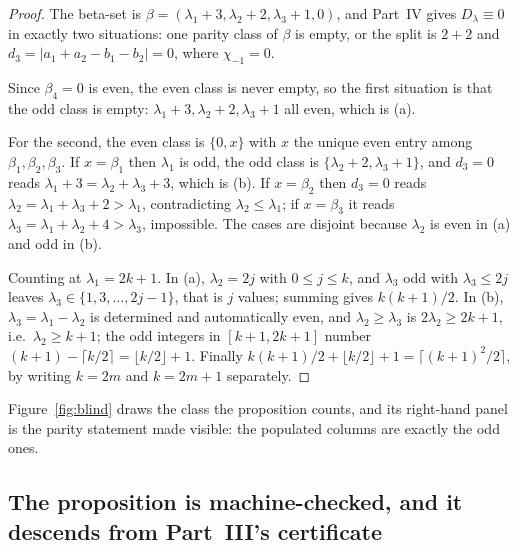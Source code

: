 \documentclass[11pt,a4paper]{article}
\begin{document}
\begin{proof}
The beta-set is $\beta=(\lambda_1+3,\lambda_2+2,\lambda_3+1,0)$, and Part~IV gives $D_\lambda\equiv0$
in exactly two situations: one parity class of $\beta$ is empty, or the split is $2+2$ and
$d_3=|a_1+a_2-b_1-b_2|=0$, where $\chi_{-1}=0$.

Since $\beta_4=0$ is even, the even class is never empty, so the first situation is that the odd
class is empty: $\lambda_1+3,\lambda_2+2,\lambda_3+1$ all even, which is (a).

For the second, the even class is $\{0,x\}$ with $x$ the unique even entry among
$\beta_1,\beta_2,\beta_3$. If $x=\beta_1$ then $\lambda_1$ is odd, the odd class is
$\{\lambda_2+2,\lambda_3+1\}$, and $d_3=0$ reads $\lambda_1+3=\lambda_2+\lambda_3+3$, which is (b).
If $x=\beta_2$ then $d_3=0$ reads $\lambda_2=\lambda_1+\lambda_3+2>\lambda_1$, contradicting
$\lambda_2\le\lambda_1$; if $x=\beta_3$ it reads $\lambda_3=\lambda_1+\lambda_2+4>\lambda_3$,
impossible. The cases are disjoint because $\lambda_2$ is even in (a) and odd in (b).

Counting at $\lambda_1=2k+1$. In (a), $\lambda_2=2j$ with $0\le j\le k$, and $\lambda_3$ odd with
$\lambda_3\le 2j$ leaves $\lambda_3\in\{1,3,\dots,2j-1\}$, that is $j$ values; summing gives
$k(k+1)/2$. In (b), $\lambda_3=\lambda_1-\lambda_2$ is determined and automatically even, and
$\lambda_2\ge\lambda_3$ is $2\lambda_2\ge 2k+1$, i.e.\ $\lambda_2\ge k+1$; the odd integers in
$[k+1,2k+1]$ number $(k+1)-\lceil k/2\rceil=\lfloor k/2\rfloor+1$. Finally
$k(k+1)/2+\lfloor k/2\rfloor+1=\lceil (k+1)^2/2\rceil$, by writing $k=2m$ and $k=2m+1$ separately.
\end{proof}

\noindent Figure~\ref{fig:blind} draws the class the proposition counts, and its right-hand panel is
the parity statement made visible: the populated columns are exactly the odd ones.


\subsection{The proposition is machine-checked, and it descends from Part~III's certificate}
\label{sec:lean}
\end{document}
